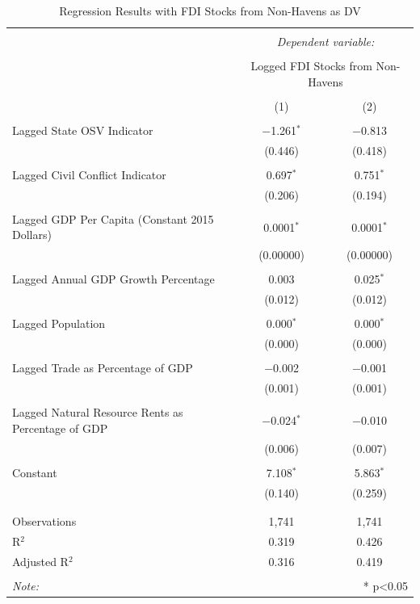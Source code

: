 \documentclass[11pt, titlepage]{article} %
\begin{document}
\begin{table}[!htbp] \centering 
  \caption{Regression Results with FDI Stocks from Non-Havens as DV} 
  \label{appreg3} 
\small 
\begin{tabular}{@{\extracolsep{5pt}}lcc} 
\\[-1.8ex]\hline 
\hline \\[-1.8ex] 
 & \multicolumn{2}{c}{\textit{Dependent variable:}} \\ 
\cline{2-3} 
\\[-1.8ex] & \multicolumn{2}{c}{Logged FDI Stocks from Non-Havens} \\ 
\\[-1.8ex] & (1) & (2)\\ 
\hline \\[-1.8ex] 
 Lagged State OSV Indicator & $-$1.261$^{*}$ & $-$0.813 \\ 
  & (0.446) & (0.418) \\ 
  & & \\ 
 Lagged Civil Conflict Indicator & 0.697$^{*}$ & 0.751$^{*}$ \\ 
  & (0.206) & (0.194) \\ 
  & & \\ 
 Lagged GDP Per Capita (Constant 2015 Dollars) & 0.0001$^{*}$ & 0.0001$^{*}$ \\ 
  & (0.00000) & (0.00000) \\ 
  & & \\ 
 Lagged Annual GDP Growth Percentage & 0.003 & 0.025$^{*}$ \\ 
  & (0.012) & (0.012) \\ 
  & & \\ 
 Lagged Population & 0.000$^{*}$ & 0.000$^{*}$ \\ 
  & (0.000) & (0.000) \\ 
  & & \\ 
 Lagged Trade as Percentage of GDP & $-$0.002 & $-$0.001 \\ 
  & (0.001) & (0.001) \\ 
  & & \\ 
 Lagged Natural Resource Rents as Percentage of GDP & $-$0.024$^{*}$ & $-$0.010 \\ 
  & (0.006) & (0.007) \\ 
  & & \\ 
 Constant & 7.108$^{*}$ & 5.863$^{*}$ \\ 
  & (0.140) & (0.259) \\ 
  & & \\ 
\hline \\[-1.8ex] 
Observations & 1,741 & 1,741 \\ 
R$^{2}$ & 0.319 & 0.426 \\ 
Adjusted R$^{2}$ & 0.316 & 0.419 \\ 
\hline 
\hline \\[-1.8ex] 
\textit{Note:}  & \multicolumn{2}{r}{* p<0.05} \\ 
\end{tabular} 
\end{table} 
\end{document}

